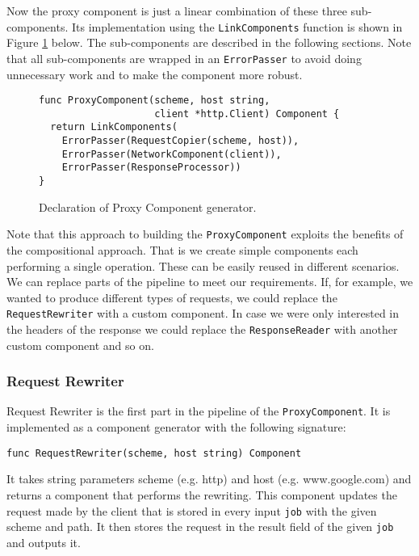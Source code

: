Now the proxy component is just a linear combination of these three
sub-components. Its implementation using the \texttt{LinkComponents}
function is shown in Figure \ref{fig:ProxyComp} below. 
The sub-components are described in the
following sections. Note that all sub-components are wrapped
in an \texttt{ErrorPasser} to avoid doing unnecessary work 
and to make the component more robust.

\begin{figure}[h]
\centering
\begin{lstlisting}
func ProxyComponent(scheme, host string, 
                    client *http.Client) Component {
  return LinkComponents(
    ErrorPasser(RequestCopier(scheme, host)),
    ErrorPasser(NetworkComponent(client)),
    ErrorPasser(ResponseProcessor))
}
\end{lstlisting}
\caption[scale=1.0]{Declaration of Proxy Component generator.}
\label{fig:ProxyComp}
\end{figure}

Note that this approach to building the \texttt{ProxyComponent} exploits
the benefits of the compositional approach. That is we create simple
components each performing a single operation. These can be easily
reused in different scenarios. We can replace parts of the pipeline 
to meet our requirements. If, for example, we wanted to produce different
types of requests, we could replace the \texttt{RequestRewriter} with
a custom component. In case we were only interested in the headers of
the response we could replace the \texttt{ResponseReader} with another 
custom component and so on.

\subsubsection{Request Rewriter}
Request Rewriter is the first part in the pipeline of the 
\texttt{ProxyComponent}. It is implemented as a component generator with the 
following signature:
\begin{lstlisting}
func RequestRewriter(scheme, host string) Component
\end{lstlisting}
It takes string parameters scheme (e.g. http) and host (e.g. www.google.com) 
and returns a component that performs the rewriting. This component
updates the request made by the client that is stored in every input 
\texttt{job} with the given scheme and path. It then stores the 
request in the result field of the given \texttt{job} and outputs it.

